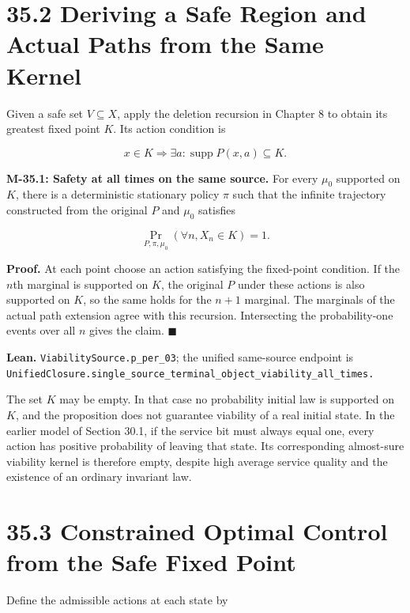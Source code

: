 \documentclass[
  english,
  11pt,
  oneside]{book}
\begin{document}
\section{35.2 Deriving a Safe Region and Actual Paths from the Same Kernel}\label{deriving-a-safe-region-and-actual-paths-from-the-same-kernel}

Given a safe set \(V\subseteq X\), apply the deletion recursion in Chapter 8 to obtain its greatest fixed point \(K\). Its action condition is

\[x\in K\Longrightarrow\exists a:\operatorname{supp}P(x,a)\subseteq K.\]

\hypertarget{m-35-1}{}\label{m-35-1}

\textbf{M-35.1: Safety at all times on the same source.} For every \(\mu_0\) supported on \(K\), there is a deterministic stationary policy \(\pi\) such that the infinite trajectory constructed from the original \(P\) and \(\mu_0\) satisfies

\[\Pr_{P,\pi,\mu_0}(\forall n, X_n\in K)=1.\]

\textbf{Proof.} At each point choose an action satisfying the fixed-point condition. If the \(n\)th marginal is supported on \(K\), the original \(P\) under these actions is also supported on \(K\), so the same holds for the \(n+1\) marginal. The marginals of the actual path extension agree with this recursion. Intersecting the probability-one events over all \(n\) gives the claim. \(\blacksquare\)

\textbf{Lean.} \nolinkurl{ViabilitySource.p_per_03}; the unified same-source endpoint is \nolinkurl{UnifiedClosure.single_source_terminal_object_viability_all_times.}

The set \(K\) may be empty. In that case no probability initial law is supported on \(K\), and the proposition does not guarantee viability of a real initial state. In the earlier model of Section 30.1, if the service bit must always equal one, every action has positive probability of leaving that state. Its corresponding almost-sure viability kernel is therefore empty, despite high average service quality and the existence of an ordinary invariant law.

\section{35.3 Constrained Optimal Control from the Safe Fixed Point}\label{constrained-optimal-control-from-the-safe-fixed-point}

Define the admissible actions at each state by
\end{document}
